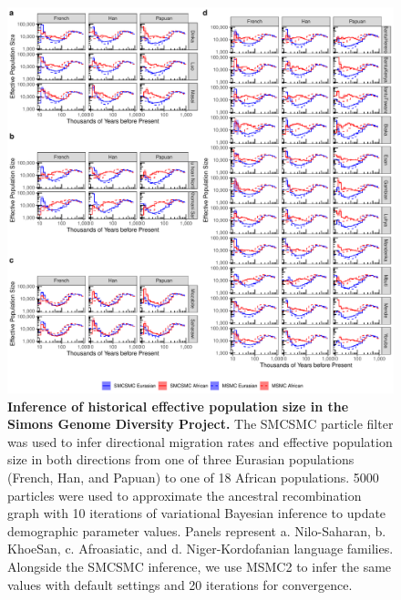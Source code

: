 \begin{figure}
	\centering
	\includegraphics[width=0.95\linewidth]{plot/sgdp_ne_new.pdf}
	\caption[Effective population size inference in the Simons Genome Diversity Project from SMCSMC and MSMC2]{{\bf Inference of historical effective population size in the Simons Genome Diversity Project.} The SMCSMC particle filter was used to infer directional migration rates and effective population size in both directions from one of three Eurasian populations (French, Han, and Papuan) to one of 18 African populations. 5000 particles were used to approximate the ancestral recombination graph with 10 iterations of variational Bayesian inference to update demographic parameter values. Panels represent a. Nilo-Saharan, b. KhoeSan, c. Afroasiatic, and d. Niger-Kordofanian language families. Alongside the SMCSMC inference, we use MSMC2 to infer the same values with default settings and 20 iterations for convergence.}	
	\label{fig:sgdp_ne}
\end{figure}


